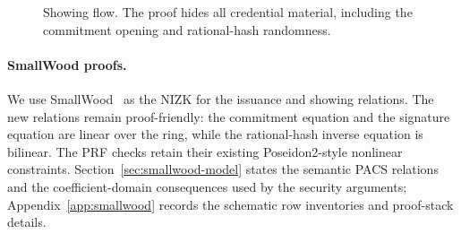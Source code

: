 \begin{figure}[h]
  \centering
  \caption{Showing flow.  The proof hides all credential material, including the commitment opening and rational-hash randomness.}
  \label{fig:showing-flow}
\end{figure}

\paragraph*{SmallWood proofs.}
We use SmallWood~\cite{EPRINT:FenRiv25b} as the NIZK for the issuance and showing relations.  The new
relations remain proof-friendly: the commitment equation and the signature equation are linear over the ring,
while the rational-hash inverse equation is bilinear.  The PRF checks retain their existing Poseidon2-style
nonlinear constraints.  Section~\ref{sec:smallwood-model} states the semantic PACS relations and the
coefficient-domain consequences used by the security arguments; Appendix~\ref{app:smallwood} records the
schematic row inventories and proof-stack details.
